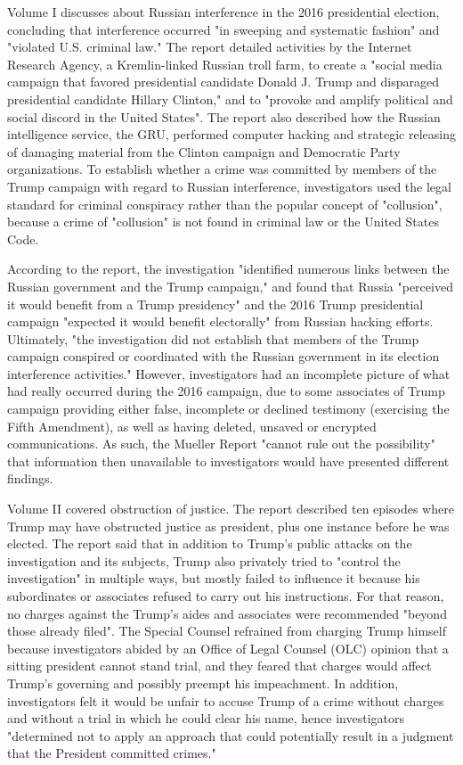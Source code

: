 Volume I discusses about Russian interference in the 2016 presidential
election, concluding that interference occurred "in sweeping and
systematic fashion" and "violated U.S. criminal law." The report
detailed activities by the Internet Research Agency, a Kremlin-linked
Russian troll farm, to create a "social media campaign that favored
presidential candidate Donald J. Trump and disparaged presidential
candidate Hillary Clinton," and to "provoke and amplify political and
social discord in the United States". The report also described how the
Russian intelligence service, the GRU, performed computer hacking and
strategic releasing of damaging material from the Clinton campaign and
Democratic Party organizations. To establish whether a crime was
committed by members of the Trump campaign with regard to Russian
interference, investigators used the legal standard for criminal
conspiracy rather than the popular concept of "collusion", because a
crime of "collusion" is not found in criminal law or the United States
Code.

According to the report, the investigation "identified numerous links
between the Russian government and the Trump campaign," and found that
Russia "perceived it would benefit from a Trump presidency" and the 2016
Trump presidential campaign "expected it would benefit electorally" from
Russian hacking efforts. Ultimately, "the investigation did not
establish that members of the Trump campaign conspired or coordinated
with the Russian government in its election interference activities."
However, investigators had an incomplete picture of what had really
occurred during the 2016 campaign, due to some associates of Trump
campaign providing either false, incomplete or declined testimony
(exercising the Fifth Amendment), as well as having deleted, unsaved or
encrypted communications. As such, the Mueller Report "cannot rule out
the possibility" that information then unavailable to investigators
would have presented different findings.

Volume II covered obstruction of justice. The report described ten
episodes where Trump may have obstructed justice as president, plus one
instance before he was elected. The report said that in addition to
Trump's public attacks on the investigation and its subjects, Trump also
privately tried to "control the investigation" in multiple ways, but
mostly failed to influence it because his subordinates or associates
refused to carry out his instructions. For that reason, no charges
against the Trump's aides and associates were recommended "beyond those
already filed". The Special Counsel refrained from charging Trump
himself because investigators abided by an Office of Legal Counsel (OLC)
opinion that a sitting president cannot stand trial, and they feared
that charges would affect Trump's governing and possibly preempt his
impeachment. In addition, investigators felt it would be unfair to
accuse Trump of a crime without charges and without a trial in which he
could clear his name, hence investigators "determined not to apply an
approach that could potentially result in a judgment that the President
committed crimes."

